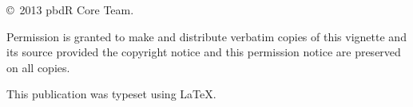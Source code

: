 \null
\vfill
\copyright\ 2013 pbdR Core Team.

Permission is granted to make and distribute verbatim copies of
this vignette and its source provided the copyright notice and
this permission notice are preserved on all copies.

This publication was typeset using \LaTeX.